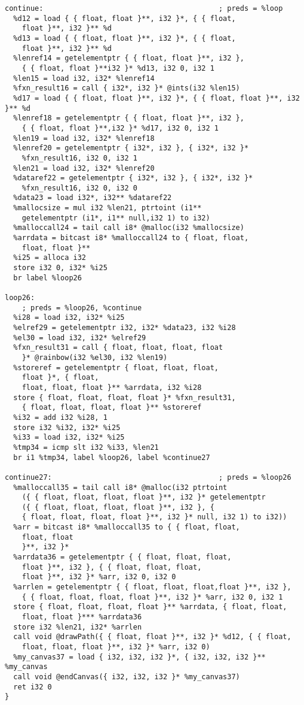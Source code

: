 \documentclass[main.tex]{subfiles}
\begin{document}
{\begin{lstlisting}
continue:                                         ; preds = %loop
  %d12 = load { { float, float }**, i32 }*, { { float,
    float }**, i32 }** %d
  %d13 = load { { float, float }**, i32 }*, { { float, 
    float }**, i32 }** %d
  %lenref14 = getelementptr { { float, float }**, i32 }, 
    { { float, float }**i32 }* %d13, i32 0, i32 1
  %len15 = load i32, i32* %lenref14
  %fxn_result16 = call { i32*, i32 }* @ints(i32 %len15)
  %d17 = load { { float, float }**, i32 }*, { { float, float }**, i32 }** %d
  %lenref18 = getelementptr { { float, float }**, i32 },
    { { float, float }**,i32 }* %d17, i32 0, i32 1
  %len19 = load i32, i32* %lenref18
  %lenref20 = getelementptr { i32*, i32 }, { i32*, i32 }*
    %fxn_result16, i32 0, i32 1
  %len21 = load i32, i32* %lenref20
  %dataref22 = getelementptr { i32*, i32 }, { i32*, i32 }*
    %fxn_result16, i32 0, i32 0
  %data23 = load i32*, i32** %dataref22
  %mallocsize = mul i32 %len21, ptrtoint (i1** 
    getelementptr (i1*, i1** null,i32 1) to i32)
  %malloccall24 = tail call i8* @malloc(i32 %mallocsize)
  %arrdata = bitcast i8* %malloccall24 to { float, float,
    float, float }**
  %i25 = alloca i32
  store i32 0, i32* %i25
  br label %loop26

loop26:                                           
    ; preds = %loop26, %continue
  %i28 = load i32, i32* %i25
  %elref29 = getelementptr i32, i32* %data23, i32 %i28
  %el30 = load i32, i32* %elref29
  %fxn_result31 = call { float, float, float, float 
    }* @rainbow(i32 %el30, i32 %len19)
  %storeref = getelementptr { float, float, float,
    float }*, { float, 
    float, float, float }** %arrdata, i32 %i28
  store { float, float, float, float }* %fxn_result31,
    { float, float, float, float }** %storeref
  %i32 = add i32 %i28, 1
  store i32 %i32, i32* %i25
  %i33 = load i32, i32* %i25
  %tmp34 = icmp slt i32 %i33, %len21
  br i1 %tmp34, label %loop26, label %continue27

continue27:                                       ; preds = %loop26
  %malloccall35 = tail call i8* @malloc(i32 ptrtoint
    ({ { float, float, float, float }**, i32 }* getelementptr
    ({ { float, float, float, float }**, i32 }, { 
    { float, float, float, float }**, i32 }* null, i32 1) to i32))
  %arr = bitcast i8* %malloccall35 to { { float, float,
    float, float 
    }**, i32 }*
  %arrdata36 = getelementptr { { float, float, float, 
    float }**, i32 }, { { float, float, float, 
    float }**, i32 }* %arr, i32 0, i32 0
  %arrlen = getelementptr { { float, float, float,float }**, i32 }, 
    { { float, float, float, float }**, i32 }* %arr, i32 0, i32 1
  store { float, float, float, float }** %arrdata, { float, float, 
    float, float }*** %arrdata36
  store i32 %len21, i32* %arrlen
  call void @drawPath({ { float, float }**, i32 }* %d12, { { float, 
    float, float, float }**, i32 }* %arr, i32 0)
  %my_canvas37 = load { i32, i32, i32 }*, { i32, i32, i32 }** %my_canvas
  call void @endCanvas({ i32, i32, i32 }* %my_canvas37)
  ret i32 0
}


\end{lstlisting}}
\end{document}
